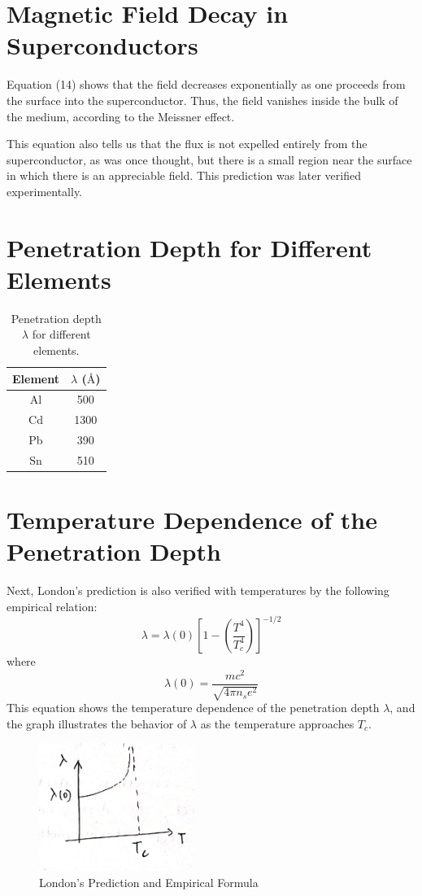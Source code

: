 \documentclass{article}
\begin{document}
\section{Magnetic Field Decay in Superconductors}

Equation (14) shows that the field decreases exponentially as one proceeds from the surface into the superconductor. Thus, the field vanishes inside the bulk of the medium, according to the Meissner effect.

This equation also tells us that the flux is not expelled entirely from the superconductor, as was once thought, but there is a small region near the surface in which there is an appreciable field. This prediction was later verified experimentally.

\section{Penetration Depth for Different Elements}

\begin{table}[h!]
\centering
\begin{tabular}{|c|c|}
\hline
\textbf{Element} & \(\lambda\) (\(\text{\AA}\)) \\ \hline
Al & 500 \\ \hline
Cd & 1300 \\ \hline
Pb & 390 \\ \hline
Sn & 510 \\ \hline
\end{tabular}
\caption{Penetration depth \(\lambda\) for different elements.}
\end{table}

\section{Temperature Dependence of the Penetration Depth}

Next, London's prediction is also verified with temperatures by the following empirical relation:
\[
\lambda = \lambda(0) \left[ 1 - \left( \frac{T^4}{T_c^4} \right) \right]^{-1/2}
\]
where
\[
\lambda(0) = \frac{mc^2}{\sqrt{4 \pi n_s e^2}}
\]
This equation shows the temperature dependence of the penetration depth \(\lambda\), and the graph illustrates the behavior of \(\lambda\) as the temperature approaches \(T_c\).

\begin{figure}
    \begin{center}
        \includegraphics[width=0.45\textwidth]{figures/6.png}
    \end{center}
    \caption{London's Prediction and Empirical Formula}\label{fig:}
\end{figure}
\end{document}
